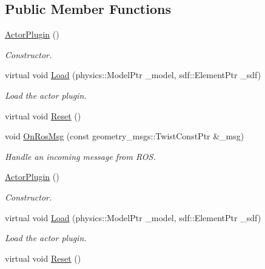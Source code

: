\subsection*{Public Member Functions}
\begin{DoxyCompactItemize}
\item 
\mbox{\hyperlink{classgazebo_1_1ActorPlugin_ab8db0f2c6a6e64f252033664932da9bb}{Actor\+Plugin}} ()
\begin{DoxyCompactList}\small\item\em Constructor. \end{DoxyCompactList}\item 
virtual void \mbox{\hyperlink{classgazebo_1_1ActorPlugin_aaf3229851338f17b7265d41a8290322d}{Load}} (physics\+::\+Model\+Ptr \+\_\+model, sdf\+::\+Element\+Ptr \+\_\+sdf)
\begin{DoxyCompactList}\small\item\em Load the actor plugin. \end{DoxyCompactList}\item 
virtual void \mbox{\hyperlink{classgazebo_1_1ActorPlugin_a94e1e04cacc4d05855f16ced457e938d}{Reset}} ()
\item 
void \mbox{\hyperlink{classgazebo_1_1ActorPlugin_ae20299e0479c1643cead3a3f06dade20}{On\+Ros\+Msg}} (const geometry\+\_\+msgs\+::\+Twist\+Const\+Ptr \&\+\_\+msg)
\begin{DoxyCompactList}\small\item\em Handle an incoming message from R\+OS. \end{DoxyCompactList}\item 
\mbox{\hyperlink{classgazebo_1_1ActorPlugin_ab8db0f2c6a6e64f252033664932da9bb}{Actor\+Plugin}} ()
\begin{DoxyCompactList}\small\item\em Constructor. \end{DoxyCompactList}\item 
virtual void \mbox{\hyperlink{classgazebo_1_1ActorPlugin_a15cb180134502f927e3b99fc3c8f42be}{Load}} (physics\+::\+Model\+Ptr \+\_\+model, sdf\+::\+Element\+Ptr \+\_\+sdf)
\begin{DoxyCompactList}\small\item\em Load the actor plugin. \end{DoxyCompactList}\item 
virtual void \mbox{\hyperlink{classgazebo_1_1ActorPlugin_a20bb6734c948e45ccd384817a5197a43}{Reset}} ()
\end{DoxyCompactItemize}


